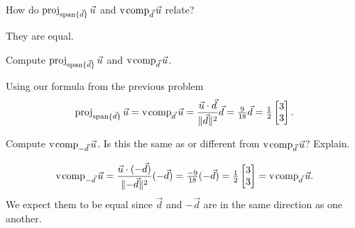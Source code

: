 \documentclass{workbook}
\begin{document}
\begin{slide}
\begin{parts}
\begin{solution}
			\end{solution}
		\item How do $\operatorname{proj}_{\operatorname{span}\{\vec d\}}\vec u$ and $\operatorname{\operatorname{v\hspace{1pt}comp}}_{\vec d}\vec u$ relate?
			\begin{solution}[inline]
				They are equal.
			\end{solution}
		\item Compute $\operatorname{proj}_{\operatorname{span}\{\vec d\}}\vec u$ and $\operatorname{\operatorname{v\hspace{1pt}comp}}_{\vec d}\vec u$.
			\begin{solution}
				Using our formula from the previous problem
				\[
					\Proj_{\Span\{\vec d\}}\vec u
					=\Comp_{\vec d}\vec u
					=\frac{\vec u\cdot \vec d}{\norm{\vec d}^2} \vec d
					=\tfrac{9}{18}\vec d = \tfrac{1}{2}\mat{3\\3}.
				\]
			\end{solution}
		\item Compute $\operatorname{\operatorname{v\hspace{1pt}comp}}_{-\vec d}\vec u$. Is this the same as or different from
			$\operatorname{\operatorname{v\hspace{1pt}comp}}_{\vec d}\vec u$? Explain.
			\begin{solution}
				\[
					\Comp_{-\vec d}\vec u
					=\frac{\vec u\cdot (-\vec d)}{\norm{-\vec d}^2} (-\vec d)
					=\tfrac{-9}{18}(-\vec d) = \tfrac{1}{2}\mat{3\\3}
					=\Comp_{\vec d}\vec u.
				\]
				We expect them to be equal since $\vec d$ and $-\vec d$ are
				in the same direction as one another.
			\end{solution}
	\end{parts}
\end{slide}

	\begin{bookonly}\singlegrid\end{bookonly}
\end{document}
